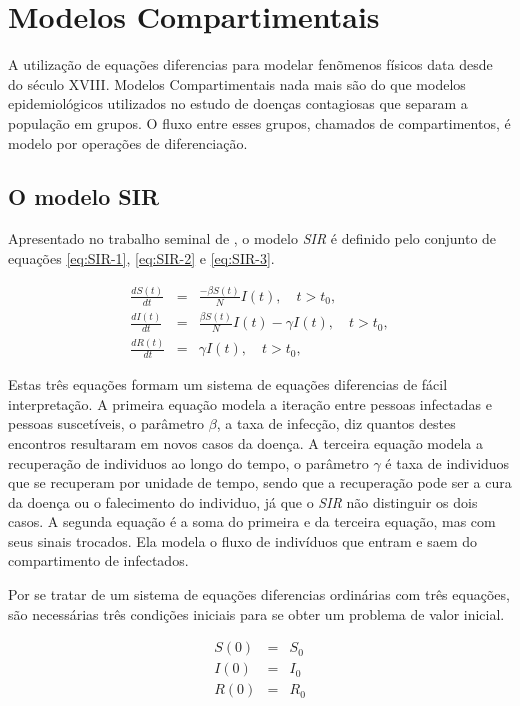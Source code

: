 \section{Modelos Compartimentais}

A utilização de equações diferencias para modelar fenõmenos físicos data desde do 
século XVIII. Modelos Compartimentais nada mais são do que modelos epidemiológicos
utilizados no estudo de doenças contagiosas que separam a população em grupos.
O fluxo entre esses grupos, chamados de compartimentos, é modelo por operações
de diferenciação.

\subsection{O modelo SIR}

Apresentado no trabalho seminal de \cite{kermack-mcKendrick:1927}, 
o modelo \textit{SIR} é definido pelo conjunto de equações \ref{eq:SIR-1}, 
\ref{eq:SIR-2} e \ref{eq:SIR-3}.

\begin{eqnarray}\label{eq:sir}
   \frac{dS(t)}{dt} &=& \frac{-\beta S(t)}{N} I(t),  \quad t > t_0, \label{eq:SIR-1}\\
   \frac{dI(t)}{dt} &=& \frac{\beta S(t)}{N} I(t) - \gamma I(t), \quad t > t_0, \label{eq:SIR-2}\\
   \frac{dR(t)}{dt} &=& \gamma I(t),  \quad t > t_0, \label{eq:SIR-3}
\end{eqnarray}

Estas três equações formam um sistema de equações diferencias de fácil interpretação.
A primeira equação modela a iteração entre pessoas infectadas e pessoas suscetíveis,
o parâmetro $\beta$, a taxa de infecção, diz quantos destes encontros resultaram 
em novos casos da doença. 
A terceira equação modela a recuperação de individuos ao
longo do tempo, o parâmetro $\gamma$ é taxa de individuos que se recuperam por 
unidade de tempo, sendo que a recuperação pode ser a cura da doença ou o falecimento
do individuo, já que o \textit{SIR} não distinguir os dois casos. 
A segunda equação é a soma do primeira e da terceira equação, mas com seus sinais
trocados. Ela modela o fluxo de indivíduos que entram e saem do compartimento
de infectados.  

Por se tratar de um sistema de equações diferencias ordinárias com três equações,
são necessárias três condições iniciais para se obter um problema de valor
inicial.

\begin{eqnarray}
   S(0) &=& S_0 \label{eq:SIR-S0}\\
   I(0) &=& I_0 \label{eq:SIR-I0}\\
   R(0) &=& R_0 \label{eq:SIR-R0}
\end{eqnarray}

